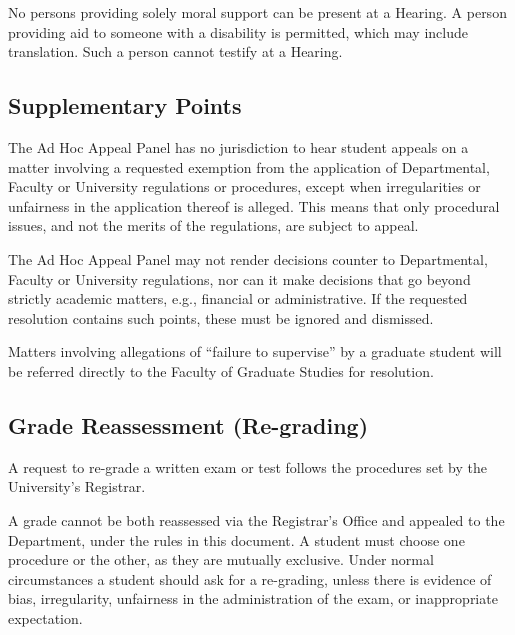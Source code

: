  No persons providing solely moral support can be present at a
Hearing.  A person providing aid to someone with a disability is permitted,
which may include translation.  Such a person cannot testify at a Hearing.


\subsection{Supplementary Points}

 The Ad Hoc Appeal Panel has no jurisdiction to hear student appeals
on a matter involving a requested exemption from the application of
Departmental, Faculty or University regulations or procedures, except when
irregularities or unfairness in the application thereof is alleged.  This means
that only procedural issues, and not the merits of the regulations, are subject
to appeal.

 The Ad Hoc Appeal Panel may not render decisions counter to
Departmental, Faculty or University regulations, nor can it make decisions that
go beyond strictly academic matters, e.g., financial or administrative.  If the
requested resolution contains such points, these must be ignored and dismissed.   

 Matters involving allegations of ``failure to supervise'' by a
graduate student will be referred directly to the Faculty of Graduate Studies
for resolution.  


\subsection{\label{sec:grade_reassessment}Grade Reassessment (Re-grading)}


 A request to re-grade a written exam or test follows the procedures
set by the University's Registrar.

 A grade cannot be both reassessed via the Registrar's Office and
appealed to the Department, under the rules in this document.  A student must
choose one procedure or the other, as they are mutually exclusive.  Under
normal circumstances a student should ask for a re-grading, unless there is
evidence of bias, irregularity, unfairness in the administration of the exam,
or inappropriate expectation.   

